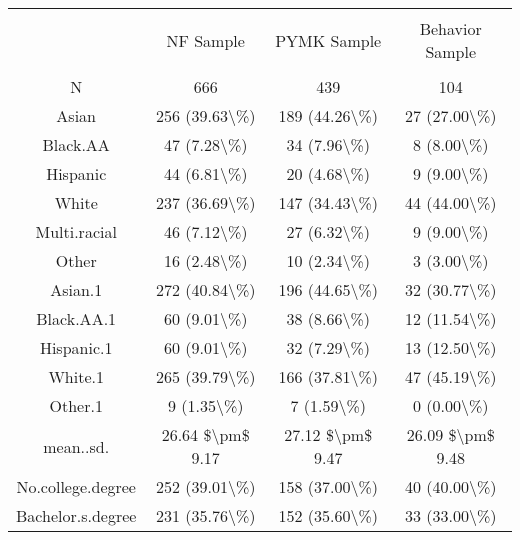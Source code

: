 
\begin{table}[!htbp] \centering 
  \caption{} 
  \label{} 
\begin{tabular}{@{\extracolsep{5pt}} cccc} 
\\[-1.8ex]\hline 
\hline \\[-1.8ex] 
 & NF Sample & PYMK Sample & Behavior Sample \\ 
\hline \\[-1.8ex] 
N & 666 & 439 & 104 \\ 
Asian & 256 (39.63\textbackslash \%) & 189 (44.26\textbackslash \%) & 27 (27.00\textbackslash \%) \\ 
Black.AA & 47 (7.28\textbackslash \%) & 34 (7.96\textbackslash \%) & 8 (8.00\textbackslash \%) \\ 
Hispanic & 44 (6.81\textbackslash \%) & 20 (4.68\textbackslash \%) & 9 (9.00\textbackslash \%) \\ 
White & 237 (36.69\textbackslash \%) & 147 (34.43\textbackslash \%) & 44 (44.00\textbackslash \%) \\ 
Multi.racial & 46 (7.12\textbackslash \%) & 27 (6.32\textbackslash \%) & 9 (9.00\textbackslash \%) \\ 
Other & 16 (2.48\textbackslash \%) & 10 (2.34\textbackslash \%) & 3 (3.00\textbackslash \%) \\ 
Asian.1 & 272 (40.84\textbackslash \%) & 196 (44.65\textbackslash \%) & 32 (30.77\textbackslash \%) \\ 
Black.AA.1 & 60 (9.01\textbackslash \%) & 38 (8.66\textbackslash \%) & 12 (11.54\textbackslash \%) \\ 
Hispanic.1 & 60 (9.01\textbackslash \%) & 32 (7.29\textbackslash \%) & 13 (12.50\textbackslash \%) \\ 
White.1 & 265 (39.79\textbackslash \%) & 166 (37.81\textbackslash \%) & 47 (45.19\textbackslash \%) \\ 
Other.1 & 9 (1.35\textbackslash \%) & 7 (1.59\textbackslash \%) & 0 (0.00\textbackslash \%) \\ 
mean..sd. & 26.64 \$\textbackslash pm\$ 9.17 & 27.12 \$\textbackslash pm\$ 9.47 & 26.09 \$\textbackslash pm\$ 9.48 \\ 
No.college.degree & 252 (39.01\textbackslash \%) & 158 (37.00\textbackslash \%) & 40 (40.00\textbackslash \%) \\ 
Bachelor.s.degree & 231 (35.76\textbackslash \%) & 152 (35.60\textbackslash \%) & 33 (33.00\textbackslash \%) \\ 

\end{tabular}
\end{table}
